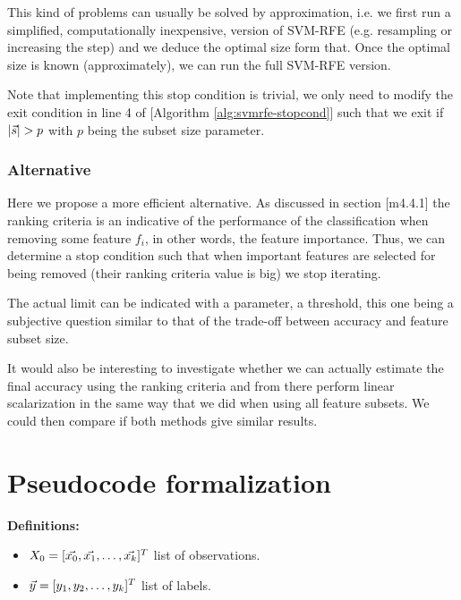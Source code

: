 This kind of problems can usually be solved by approximation, i.e. we first run a simplified, computationally inexpensive, version of SVM-RFE (e.g. resampling or increasing the step) and we deduce the optimal size form that. Once the optimal size is known (approximately), we can run the full SVM-RFE version.

Note that implementing this stop condition is trivial, we only need to modify the exit condition in line 4 of [Algorithm \ref{alg:svmrfe-stopcond}] such that we exit if $|\vec{s}| > p$ with $p$ being the subset size parameter.

\subsubsection*{Alternative}

Here we propose a more efficient alternative. As discussed in section [m4.4.1] the ranking criteria is an indicative of the performance of the classification when re\-mov\-ing some feature $f_i$, in other words, the feature importance. Thus, we can determine a stop condition such that when important features are selected for being removed (their ranking criteria value is big) we stop iterating.

The actual limit can be indicated with a parameter, a threshold, this one being a subjective question similar to that of the trade-off between accuracy and feature subset size.

It would also be interesting to investigate whether we can actually estimate the final accuracy using the ranking criteria and from there perform linear scalarization in the same way that we did when using all feature subsets. We could then compare if both methods give similar results.

\section{Pseudocode formalization}

\textbf{Definitions:}

\begin{itemize}
    \item $X_0 = [\vec{x_0}, \vec{x_1}, \dotsc, \vec{x_k}]^T$ list of observations.
    \item $\vec{y} = [y_1, y_2, \dotsc, y_k]^T$ list of labels.
\end{itemize}

